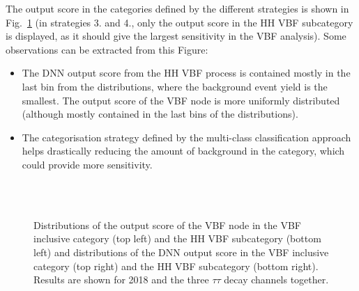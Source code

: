 \documentclass[../main.tex]{subfiles}
\begin{document}
The output score in the categories defined by the different strategies is shown in Fig.~\ref{hh:fig:vbf_signal_extraction} (in strategies 3. and 4., only the output score in the HH VBF subcategory is displayed, as it should give the largest sensitivity in the VBF analysis). Some observations can be extracted from this Figure:
\begin{itemize}
	\item The DNN output score from the HH VBF process is contained mostly in the last bin from the distributions, where the background event yield is the smallest. The output score of the VBF node is more uniformly distributed (although mostly contained in the last bins of the distributions).
	\item The categorisation strategy defined by the multi-class classification approach helps drastically reducing the amount of background in the category, which could provide more sensitivity.
\end{itemize} 

\begin{figure}[h!]
\begin{center}
\\
\\
\end{center}
\caption[Output scores for the different VBF signal extraction strategies]{Distributions of the output score of the VBF node in the VBF inclusive category (top left) and the HH VBF subcategory (bottom left) and distributions of the DNN output score in the VBF inclusive category (top right) and the HH VBF subcategory (bottom right). Results are shown for 2018 and the three $\tau\tau$ decay channels together.}
\label{hh:fig:vbf_signal_extraction}
\end{figure}
\end{document}
